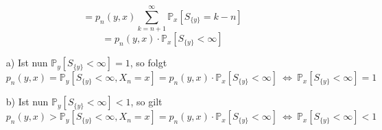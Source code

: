 \begin{equation*}
= p_{n}(y,x) \sum_{k=n+1}^{\infty}\mathbb{P}_{x}[S_{\lbrace y \rbrace} = k-n]
\end{equation*}
\begin{equation*}
 = p_{n}(y,x) \cdot \mathbb{P}_{x}[S_{\lbrace y \rbrace} < \infty]
\end{equation*}
\begin{itemize}
\item[a)] Ist nun $\mathbb{P}_{y}[S_{\lbrace y \rbrace} < \infty] = 1$, so folgt
\begin{equation*}
p_{n}(y,x) = \mathbb{P}_{y}[S_{\lbrace y \rbrace} < \infty, X_{n} = x] = p_{n}(y,x) \cdot \mathbb{P}_{x}[S_{\lbrace y \rbrace} < \infty] \: \Leftrightarrow \: \mathbb{P}_{x}[S_{\lbrace y \rbrace} < \infty] = 1 
\end{equation*}
\item[b)] Ist nun $\mathbb{P}_{y}[S_{\lbrace y \rbrace} < \infty] < 1$, so gilt
\begin{equation*}
p_{n}(y,x) > \mathbb{P}_{y}[S_{\lbrace y \rbrace} < \infty, X_{n} = x] = p_{n}(y,x) \cdot \mathbb{P}_{x}[S_{\lbrace y \rbrace} < \infty] \: \Leftrightarrow \: \mathbb{P}_{x}[S_{\lbrace y \rbrace} < \infty] < 1 
\end{equation*}
\end{itemize}